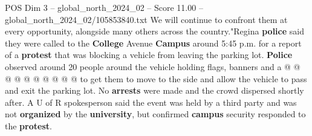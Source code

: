\begin{textsample}{POS Dim 3 – global\_north\_2024\_02 – Score 11.00 – global\_north\_2024\_02/105853840.txt}
We will continue to confront them at every opportunity, alongside many others across the country."Regina \textbf{police} said they were called to the \textbf{College} Avenue \textbf{Campus} around 5:45 p.m. for a report of a \textbf{protest} that was blocking a vehicle from leaving the parking lot. \textbf{Police} observed around 20 people around the vehicle holding flags, banners and a @ @ @ @ @ @ @ @ @ @ to get them to move to the side and allow the vehicle to pass and exit the parking lot.
No \textbf{arrests} were made and the crowd dispersed shortly after.
A U of R spokesperson said the event was held by a third party and was not \textbf{organized} by the \textbf{university}, but confirmed \textbf{campus} security responded to the \textbf{protest}.

\end{textsample}
